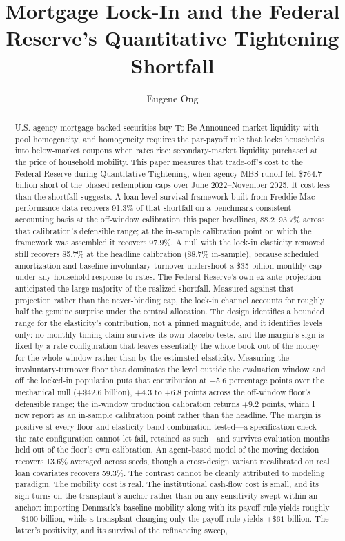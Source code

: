 \documentclass[12pt]{article}
\title{Mortgage Lock-In and the Federal Reserve's Quantitative Tightening Shortfall}
\author{Eugene Ong}
\affil{Carnegie Mellon University}
\date{}
\begin{document}
\maketitle
\begin{abstract}
\noindent U.S. agency mortgage-backed securities buy To-Be-Announced market liquidity with pool homogeneity, and homogeneity requires the par-payoff rule that locks households into below-market coupons when rates rise: secondary-market liquidity purchased at the price of household mobility. This paper measures that trade-off's cost to the Federal Reserve during Quantitative Tightening, when agency MBS runoff fell \$764.7 billion short of the phased redemption caps over June 2022--November 2025. It cost less than the shortfall suggests. A loan-level survival framework built from Freddie Mac performance data recovers 91.3\% of that shortfall on a benchmark-consistent accounting basis at the off-window calibration this paper headlines, 88.2--93.7\% across that calibration's defensible range; at the in-sample calibration point on which the framework was assembled it recovers 97.9\%. A null with the lock-in elasticity removed still recovers 85.7\% at the headline calibration (88.7\% in-sample), because scheduled amortization and baseline involuntary turnover undershoot a \$35 billion monthly cap under any household response to rates. The Federal Reserve's own ex-ante projection anticipated the large majority of the realized shortfall. Measured against that projection rather than the never-binding cap, the lock-in channel accounts for roughly half the genuine surprise under the central allocation. The design identifies a bounded range for the elasticity's contribution, not a pinned magnitude, and it identifies levels only: no monthly-timing claim survives its own placebo tests, and the margin's sign is fixed by a rate configuration that leaves essentially the whole book out of the money for the whole window rather than by the estimated elasticity. Measuring the involuntary-turnover floor that dominates the level outside the evaluation window and off the locked-in population puts that contribution at $+5.6$ percentage points over the mechanical null ($+\$42.6$ billion), $+4.3$ to $+6.8$ points across the off-window floor's defensible range; the in-window production calibration returns $+9.2$ points, which I now report as an in-sample calibration point rather than the headline. The margin is positive at every floor and elasticity-band combination tested---a specification check the rate configuration cannot let fail, retained as such---and survives evaluation months held out of the floor's own calibration. An agent-based model of the moving decision recovers 13.6\% averaged across seeds, though a cross-design variant recalibrated on real loan covariates recovers 59.3\%. The contrast cannot be cleanly attributed to modeling paradigm. The mobility cost is real. The institutional cash-flow cost is small, and its sign turns on the transplant's anchor rather than on any sensitivity swept within an anchor: importing Denmark's baseline mobility along with its payoff rule yields roughly $-\$100$ billion, while a transplant changing only the payoff rule yields $+\$61$ billion. The latter's positivity, and its survival of the refinancing sweep, 
\end{abstract}
\end{document}
